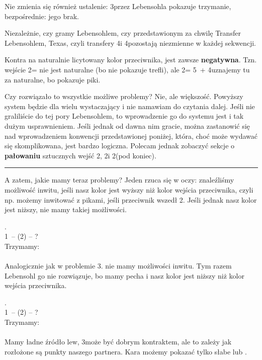 \documentclass[12pt, a4paper]{article}
\begin{document}
Nie zmienia się również ustalenie: 3\nt przez Lebensohla pokazuje trzymanie, bezpośrednie: jego brak.

\begin{formal}
    Niezależnie, czy gramy Lebensohlem, czy przedstawionym
    za chwilę Transfer Lebensohlem, Texas, czyli transfery
    4\diams i 4\hearts pozostają niezmienne w każdej sekwencji.
\end{formal}

\begin{formal}
    Kontra na naturalnie licytowany kolor przeciwnika, jest zawsze \textbf{negatywna}.
    Tzn. wejście 2\clubs = \major nie jest naturalne (bo nie pokazuje trefli),
    ale 2\spades = 5\spades\ + 4\minor uznajemy tu za naturalne,
    bo pokazuje piki.
\end{formal}

Czy rozwiązało to wszystkie możliwe problemy? Nie, ale większość. Powyższy system
będzie dla wielu wystaczający i nie namawiam do czytania dalej. Jeśli nie graliliście do tej pory
Lebensohlem, to wprowadzenie go do systemu jest i tak dużym usprawnieniem. Jeśli jednak od dawna 
nim gracie, można zastanowić się nad wprowadzeniem konwencji przedstawionej poniżej, która, choć może
wydawać się skomplikowana, jest bardzo logiczna. Polecam jednak
zobaczyć sekcje o \textbf{pałowaniu} sztucznych wejść 2\clubs, 2\diams i 2\nt (pod koniec).

\vspace{0.4cm}
\hrule

A zatem, jakie mamy teraz problemy? Jeden rzuca się w oczy: znaleźliśmy możliwość inwitu, jeśli
nasz kolor jest wyższy niż kolor wejścia przeciwnika, czyli np. możemy inwitować z pikami, jeśli
przeciwnik wszedł 2\hearts. Jeśli jednak nasz kolor jest niższy, nie mamy takiej możliwości.

\vspace{0.3cm}
.\\
1\nt\ -- (2\spades) -- ?\\
Trzymamy:\\
\\
Analogicznie jak w problemie 3. nie mamy możliwości inwitu. Tym razem Lebensohl go nie rozwiązuje,
bo mamy pecha i nasz kolor jest niższy niż kolor wejścia przeciwnika.

\vspace{0.3cm}
.\\
1\nt\ -- (2\hearts) -- ?\\
Trzymamy:\\
\\
Mamy ładne źródło lew, 3\nt może być dobrym kontraktem, ale to zależy jak rozłożone
są punkty naszego partnera. Kara możemy pokazać tylko słabe lub \gf.
\end{document}
